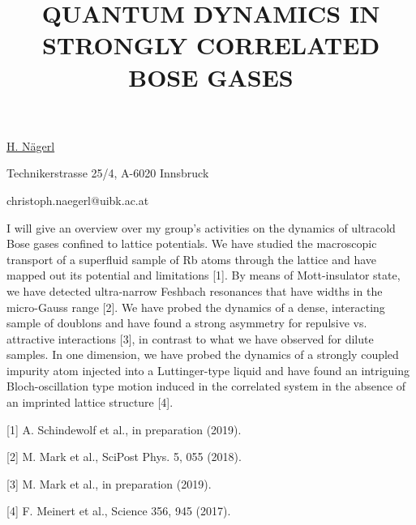 \title{QUANTUM DYNAMICS IN STRONGLY CORRELATED BOSE GASES}

\underline{H. N\"{a}gerl}  

{\normalsize{\vspace{-4mm}
Technikerstrasse 25/4,
A-6020 Innsbruck



\email christoph.naegerl@uibk.ac.at}}

I will give an overview over my group’s activities on the dynamics of ultracold Bose gases confined to lattice potentials. We have studied the macroscopic transport of a superfluid sample of Rb atoms through the lattice and have mapped out its potential and limitations [1]. By means of Mott-insulator state, we have detected ultra-narrow Feshbach resonances that have widths in the micro-Gauss range [2]. We have probed the dynamics of a dense, interacting sample of doublons and have found a strong asymmetry for repulsive vs. attractive interactions [3], in contrast to what we have observed for dilute samples. In one dimension, we have probed the dynamics of a strongly coupled impurity atom injected into a Luttinger-type liquid and have found an intriguing Bloch-oscillation type motion induced in the correlated system in the absence of an imprinted lattice structure [4].

{\normalsize
[1] A. Schindewolf et al., in preparation (2019).
\vsp

[2] M. Mark et al., SciPost Phys. 5, 055 (2018).
\vsp

[3] M. Mark et al., in  preparation (2019).
\vsp

[4] F. Meinert et al., Science 356, 945 (2017).
}


\vspace{\baselineskip}